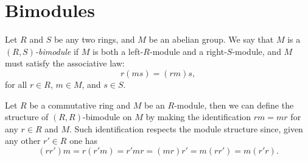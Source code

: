 \section{Bimodules}

\begin{definition}[Bimodule]
    \label{def:bimodule}
    Let \(R\) and \(S\) be any two rings, and \(M\) be an abelian group. We say that
    \(M\) is a \emph{\((R, S)\)-bimodule} if \(M\) is both a left-\(R\)-module and a
    right-\(S\)-module, and \(M\) must satisfy the associative law:
    \[
        r (m s) = (r m) s,
    \]
    for all \(r \in R\), \(m \in M\), and \(s \in S\).
\end{definition}

\begin{example}
    \label{exp:R-commutative-R-R-bimodule}
    Let \(R\) be a commutative ring and \(M\) be an \(R\)-module, then we can define
    the structure of \((R, R)\)-bimodule on \(M\) by making the identification \(r m
    = m r\) for any \(r \in R\) and \(M\). Such identification respects the module
    structure since, given any other \(r' \in R\) one has
    \[
        (r r') m = r (r' m) = r' m r = (m r) r' = m (r r') = m (r' r).
    \]
\end{example}

